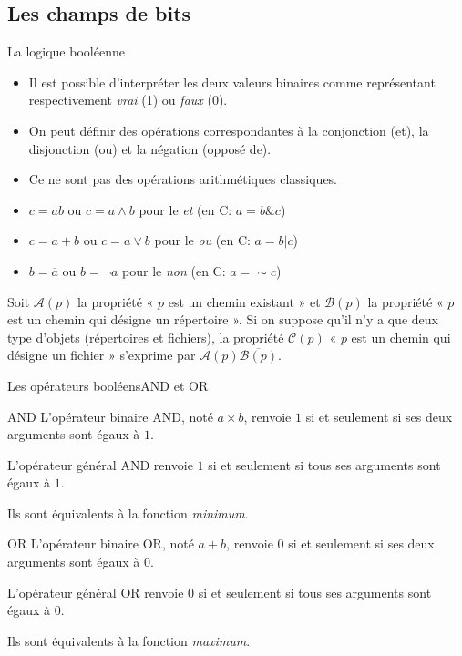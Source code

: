 \subsection{Les champs de bits}
\begin{frame}{La logique booléenne}
  \begin{itemize}
  \item Il est possible d'interpréter les deux valeurs binaires comme
    représentant respectivement \emph{vrai} (1) ou \emph{faux} (0).
  \item On peut définir des opérations correspondantes à la conjonction (et),
    la disjonction (ou) et la négation (opposé de).
  \item[\dialogerror] Ce ne sont pas des opérations arithmétiques classiques.
  \item[\dialogsystem] $c=ab$ ou $c=a\wedge b$ pour le \emph{et} (en C:
    $a=b\&c$)
  \item[\dialogsystem] $c=a+b$ ou $c=a\vee b$ pour le \emph{ou} (en C:
    $a=b|c$)
  \item[\dialogsystem] $b=\overline{a}$ ou $b=\neg a$ pour le \emph{non} (en
    C: $a=\sim c$)
  \end{itemize}
  \begin{example}
    Soit $\mathcal A(p)$ la propriété « $p$ est un chemin existant » et
    $\mathcal B(p)$ la propriété « $p$ est un chemin qui désigne un répertoire
    ». Si on suppose qu'il n'y a que deux type d'objets (répertoires et
    fichiers), la propriété $\mathcal C(p)$ « $p$ est un chemin qui désigne un
    fichier » s'exprime par $\mathcal A(p)\overline{\mathcal B(p)}$.
  \end{example}
\end{frame}
\begin{frame}{Les opérateurs booléens}{AND et OR}
  \begin{block}{AND}
    L'opérateur binaire AND, noté $a\times b$, renvoie $1$ si et seulement si
    ses deux arguments sont égaux à $1$.

    L'opérateur général AND renvoie $1$ si et seulement si tous ses arguments
    sont égaux à $1$.

    Ils sont équivalents à la fonction \emph{minimum}.
  \end{block}
  \begin{block}{OR}
    L'opérateur binaire OR, noté $a+b$, renvoie $0$ si et seulement si ses
    deux arguments sont égaux à $0$.

    L'opérateur général OR renvoie $0$ si et seulement si tous ses arguments
    sont égaux à $0$.

    Ils sont équivalents à la fonction \emph{maximum}.
  \end{block}
\end{frame}
